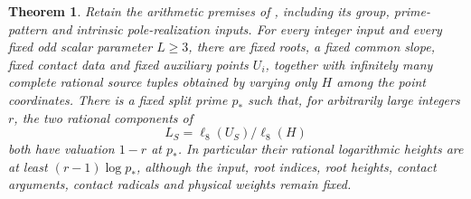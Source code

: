 \documentclass[11pt,a4paper]{article}
\newtheorem{theorem}{Theorem}[section]
\begin{document}
\begin{theorem}\label{thm:unbounded}
Retain the arithmetic premises of \cite{Scalar}, including its group,
prime-pattern and intrinsic pole-realization inputs. For every integer
input and every fixed odd scalar parameter \(L\ge3\), there are
fixed roots, a fixed common slope, fixed contact data and fixed auxiliary
points \(U_i\), together with infinitely many complete rational source
tuples obtained by varying only \(H\) among the point coordinates.
There is a fixed split prime \(p_*\) such that, for arbitrarily large
integers \(r\), the two rational components of
\[
              L_S=\ell_8(U_S)/\ell_8(H)
\]
both have valuation \(1-r\) at \(p_*\). In particular their
rational logarithmic heights are at least \((r-1)\log p_*\),
although the input, root indices, root heights, contact arguments,
contact radicals and physical weights remain fixed.
\end{theorem}
\end{document}
